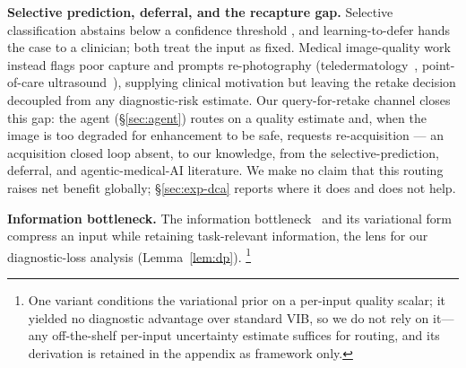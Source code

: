 \textbf{Selective prediction, deferral, and the recapture gap.}
Selective classification abstains below a confidence threshold
\citep{geifman2017selective,geifman2019selectivenet}, and learning-to-defer
hands the case to a clinician; both treat the input as fixed. Medical
image-quality work instead flags poor capture and prompts re-photography
(teledermatology~\citep{vodrahalli2021teledermatology,jalaboi2023explainable},
point-of-care ultrasound~\citep{zhao2020lungus}), supplying clinical
motivation but leaving the retake decision decoupled from any diagnostic-risk
estimate. Our query-for-retake channel closes this gap: the agent
(\S\ref{sec:agent}) routes on a quality estimate and, when the image is too
degraded for enhancement to be safe, requests re-acquisition --- an acquisition
closed loop absent, to our knowledge, from the selective-prediction, deferral,
and agentic-medical-AI literature. We make no claim that this routing raises net
benefit globally; \S\ref{sec:exp-dca} reports where it does and does not help.

\textbf{Information bottleneck.}
The information bottleneck~\citep{tishby2000information} and its variational
form~\citep[VIB;][]{alemi2017deep} compress an input while retaining
task-relevant information, the lens for our diagnostic-loss analysis
(Lemma~\ref{lem:dp}).%
\footnote{One variant conditions the variational prior on a per-input quality
scalar; it yielded no diagnostic advantage over standard VIB, so we do not rely
on it---any off-the-shelf per-input uncertainty estimate suffices for routing,
and its derivation is retained in the appendix as framework only.}
